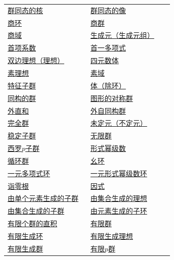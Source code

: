\begin{longtable}{@{}>{\raggedright\arraybackslash}p{0.47\linewidth}>{\raggedright\arraybackslash}p{0.47\linewidth}@{}}
\hyperref[p2:concept:c1-l483]{群同态的核} & \hyperref[p2:concept:c1-l483]{群同态的像}\\
\hyperref[p2:concept:c1-l1252]{商环} & \hyperref[p2:concept:c1-l681]{商群}\\
\hyperref[p2:concept:c3-fraction-field]{商域} & \hyperref[p2:concept:c2-l146]{生成元（生成元组）}\\
\hyperref[p2:concept:c3-degree]{首项系数} & \hyperref[p2:concept:c3-degree]{首一多项式}\\
\hyperref[p2:concept:c1-l1201]{双边理想（理想）} & \hyperref[p2:concept:c1-l1092]{四元数体}\\
\hyperref[p2:concept:c3-prime-maximal]{素理想} & \hyperref[p2:concept:c1-l1517]{素域}\\
\hyperref[p2:concept:c2-l891]{特征子群} & \hyperref[p2:concept:c1-l1037]{体（除环）}\\
\hyperref[p2:concept:c1-l388]{同构的群} & \hyperref[p2:concept:c1-l156]{图形的对称群}\\
\hyperref[p2:concept:c2-l1501]{外直和} & \hyperref[p2:concept:c2-l845]{外自同构群}\\
\hyperref[p2:concept:c2-l885]{完全群} & \hyperref[p2:concept:c3-indeterminate]{未定元（不定元）}\\
\hyperref[p2:concept:c2-l1046]{稳定子群} & \hyperref[p2:concept:c1-l149]{无限群}\\
\hyperref[p2:concept:c2-l1287]{西罗$p$子群} & \hyperref[p2:concept:c3-formal-series]{形式幂级数}\\
\hyperref[p2:concept:c2-l204]{循环群} & \hyperref[p2:concept:c1-l954]{幺环}\\
\hyperref[p2:concept:c3-polynomial-ring]{一元多项式环} & \hyperref[p2:concept:c3-formal-series]{一元形式幂级数环}\\
\hyperref[p2:concept:c3-nilradical]{诣零根} & \hyperref[p2:concept:c3-divisibility]{因式}\\
\hyperref[p2:concept:c1-l353]{由单个元素生成的子群} & \hyperref[p2:concept:c3-generated-ideal]{由集合生成的理想}\\
\hyperref[p2:concept:c2-l142]{由集合生成的子群} & \hyperref[p2:concept:c3-generated-subring]{由元素生成的子环}\\
\hyperref[p2:concept:c2-l1505]{有限个群的直积} & \hyperref[p2:concept:c1-l149]{有限群}\\
\hyperref[p2:concept:c3-finitely-generated-ring]{有限生成环} & \hyperref[p2:concept:c3-generated-ideal]{有限生成理想}\\
\hyperref[p2:concept:c2-l146]{有限生成群} & \hyperref[p2:concept:c2-l1111]{有限$p$群}\\

\end{longtable}
